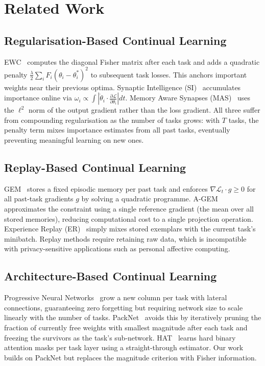 \documentclass[conference]{IEEEtran}
\begin{document}
\section{Related Work}

\subsection{Regularisation-Based Continual Learning}

EWC~\cite{kirkpatrick2017overcoming} computes the diagonal Fisher matrix after each task
and adds a quadratic penalty $\frac{\lambda}{2}\sum_i F_i(\theta_i - \theta^*_i)^2$ to
subsequent task losses.  This anchors important weights near their previous optima.
Synaptic Intelligence (SI)~\cite{zenke2017continual} accumulates importance online via
$\omega_i \propto \int |\dot\theta_i \cdot \frac{\partial\mathcal{L}}{\partial\theta_i}| dt$.
Memory Aware Synapses (MAS)~\cite{aljundi2018memory} uses the $\ell^2$ norm of the output
gradient rather than the loss gradient.  All three suffer from compounding regularisation
as the number of tasks grows: with $T$ tasks, the penalty term mixes importance estimates
from all past tasks, eventually preventing meaningful learning on new ones.

\subsection{Replay-Based Continual Learning}

GEM~\cite{lopezpaz2017gradient} stores a fixed episodic memory per past task and
enforces $\nabla\mathcal{L}_t \cdot g \geq 0$ for all past-task gradients $g$ by solving
a quadratic programme.  A-GEM~\cite{chaudhry2019efficient} approximates the constraint
using a single reference gradient (the mean over all stored memories), reducing
computational cost to a single projection operation.
Experience Replay (ER)~\cite{rolnick2019experience} simply mixes stored exemplars with
the current task's minibatch.  Replay methods require retaining raw data, which is
incompatible with privacy-sensitive applications such as personal affective computing.

\subsection{Architecture-Based Continual Learning}

Progressive Neural Networks~\cite{rusu2016progressive} grow a new column per task with
lateral connections, guaranteeing zero forgetting but requiring network size to scale
linearly with the number of tasks.  PackNet~\cite{mallya2018packnet} avoids this by
iteratively pruning the fraction of currently free weights with smallest magnitude after
each task and freezing the survivors as the task's sub-network.  HAT~\cite{serra2018overcoming}
learns hard binary attention masks per task layer using a straight-through estimator.
Our work builds on PackNet but replaces the magnitude criterion with Fisher information.
\end{document}
